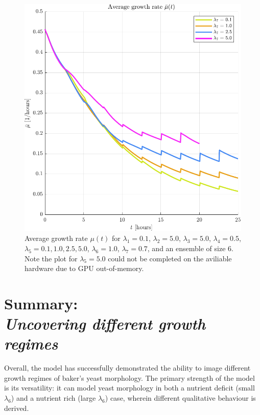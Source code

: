\begin{figure}[!htb] %
    \centering
    \includegraphics[width= \textwidth]{
        chapter4/figures/Average_mu_EnsembleSize_6o0_L1_0o10_L2_5o00_L3_5o00_L4_0o50_L5_0o10_L6_1o00_L7_0o70.pdf}
    \caption{Average growth rate $\mu(t)$ for 
             $\lambda_1 = 0.1$,  
             $\lambda_2 = 5.0$, 
             $\lambda_3 = 5.0$, 
             $\lambda_4 = 0.5$, 
             $\lambda_5 = 0.1, 1.0, 2.5, 5.0$, 
             $\lambda_6 = 1.0$, 
             $\lambda_7 = 0.7$, and an ensemble of size $6$. Note the plot 
             for $\lambda_5 = 5.0$ could not be completed on the aviliable hardware
             due to GPU out-of-memory.}
    \label{fig:averageMuComparison_varyMobility}
\end{figure}


\section{Summary: \\ \textit{Uncovering different growth regimes}}

Overall, the model has successfully demonstrated the ability 
to image different growth regimes of baker's yeast morphology.
The primary strength of the model is its versatility:
it can model yeast morphology in both a nutrient deficit (small $\lambda_6$)
and a nutrient rich (large $\lambda_6$) case, wherein 
different qualitative behaviour is derived. 
\\

